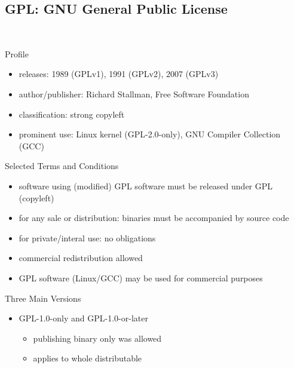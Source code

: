 \subsection{GPL: GNU General Public License}
\begin{frame}{\insertsubsection\ }
	\begin{fancycolumns}
		\begin{definition}{Profile}
			\begin{itemize}
				\setlength\itemsep{.0em}
				\item releases: 1989 (GPLv1), 1991 (GPLv2), 2007 (GPLv3)
				\item author/publisher: Richard Stallman, Free Software Foundation
				\item classification: strong copyleft
				\item prominent use: Linux kernel (GPL-2.0-only), GNU Compiler Collection (GCC)
			\end{itemize}
		\end{definition}
		\begin{example}{Selected Terms and Conditions}
			\begin{itemize}
				\setlength\itemsep{.0em}
				\item software using (modified) GPL software must be released under GPL (copyleft) %
				\item for any sale or distribution: binaries must be accompanied by source code
				\item for private/interal use: no obligations
				\item commercial redistribution allowed
				\item GPL software (Linux/GCC) may be used for commercial purposes
			\end{itemize}
		\end{example}
		\nextcolumn
		\begin{exampletight}{}
			\centering{}
		\end{exampletight}
		\begin{note}{Three Main Versions}
			\begin{itemize}
				\item GPL-1.0-only and GPL-1.0-or-later
				\begin{itemize}
					\item publishing binary only was allowed
					\item applies to whole distributable

\end{itemize}
\end{itemize}
\end{note}
\end{fancycolumns}
\end{frame}
